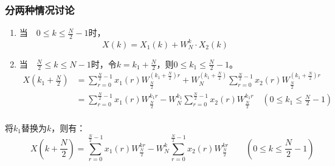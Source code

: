 \documentclass[notheorems,compress,mathserif,table]{beamer}
\begin{document}
\begin{frame}[shrink]\frametitle{分两种情况讨论}  %
\begin{enumerate}
\item 当$\quad 0\leq k\leq \frac{N}{2}-1$时，
$$X(k)=X_{1}(k) + W_{N}^{k}\cdot X_{2}(k)$$
\item 当$\quad \frac{N}{2}\leq k\leq N-1$时，令$k=k_{1}+\frac{N}{2}$，则$0\leq k_{1}\leq \frac{N}{2}-1$。
\begin{equation*}
\begin{split}
X(k_{1}+\frac{N}{2})
&=\sum_{r=0}^{\frac{N}{2}-1}x_{1}(r)W_{\frac{N}{2}}^{(k_{1}+\frac{N}{2})r} +W_{N}^{(k_{1}+\frac{N}{2})}\sum_{r=0}^{\frac{N}{2}-1}x_{2}(r)W_{\frac{N}{2}}^{(k_{1}+\frac{N}{2})r}\\
&=\sum_{r=0}^{\frac{N}{2}-1}x_{1}(r)W_{\frac{N}{2}}^{k_{1}r} -W_{N}^{k_{1}}\sum_{r=0}^{\frac{N}{2}-1}x_{2}(r)W_{\frac{N}{2}}^{k_{1}r}\quad(0\leq k_1\leq \frac{N}{2}-1)\\
\end{split}
\end{equation*}
\end{enumerate}

\quad\quad 将$k_{1}$替换为$k$，则有：
\begin{equation*}
\qquad\quad   X(k+\frac{N}{2})
=\sum_{r=0}^{\frac{N}{2}-1}x_{1}(r)W_{\frac{N}{2}}^{kr} -W_{N}^{k}\sum_{r=0}^{\frac{N}{2}-1}x_{2}(r)W_{\frac{N}{2}}^{kr}
\quad\quad(0\leq k\leq \frac{N}{2}-1)
\end{equation*}
\end{frame}
\end{document}
